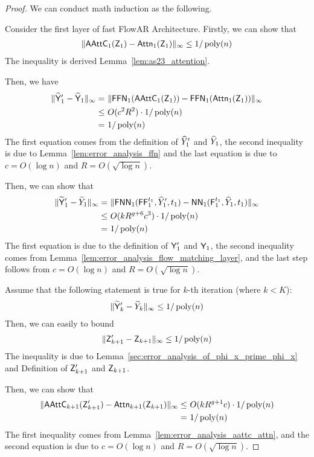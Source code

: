 \begin{proof}
    We can conduct math induction as the following.
    
    Consider the first layer of fast FlowAR Architecture. Firstly, we can show that
    \begin{align*}
        \| \mathsf{AAttC}_1(\mathsf{Z}_{1}) - \mathsf{Attn}_1(\mathsf{Z}_{1})\|_\infty \leq 1/\operatorname{poly}(n)
    \end{align*}
    The inequality is derived Lemma~\ref{lem:as23_attention}.
    
    Then, we have
    \begin{align*}
        \| \widehat{\mathsf{Y}}'_1 - \widehat{\mathsf{Y}}_1\|_\infty =&~ \|\mathsf{FFN}_1(\mathsf{AAttC}_1(\mathsf{Z}_{1})) - \mathsf{FFN}_1(\mathsf{Attn}_1(\mathsf{Z}_{1}))\|_\infty\\
        \leq&~ O(c^2 R^2) \cdot 1/\operatorname{poly}(n)\\
        = &~ 1/\operatorname{poly}(n)
    \end{align*}
    The first equation comes from the definition of $\widehat{Y}'_1$ and $\widehat{Y}_1$, the second inequality is due to Lemma~\ref{lem:error_analysis_ffn} and the last equation is due to $c = O(\log n)$ and $R = O(\sqrt{\log n})$.

    Then, we can show that
    \begin{align*}
        \| \widetilde{\mathsf{Y}}'_1 - \widetilde{Y}_1\|_\infty =&~ \| \mathsf{FNN}_1(\mathsf{FF}^{t_1}_1,\widehat{Y}'_1,t_1)  - \mathsf{NN}_1(\mathsf{F}^{t_1}_1,\widehat{Y}_1,t_1) \|_\infty\\
        \leq &~ O(kR^{g+6}c^3) \cdot 1/\operatorname{poly}(n)\\
        =&~ 1/\operatorname{poly}(n)
    \end{align*}
    The first equation is due to the definition of $\mathsf{Y}'_1$ and $\mathsf{Y}_1$, the second inequality comes from Lemma~\ref{lem:error_analysis_flow_matching_layer}, and the last step follows from $c = O(\log n)$ and $R = O(\sqrt{\log n})$.


    Assume that the following statement is true for $k$-th iteration (where $k < K$):
    \begin{align*}
        \|\widetilde{\mathsf{Y}}'_k - \widetilde{Y}_k\|_\infty \leq 1/\operatorname{poly}(n)
    \end{align*}
    Then, we can easily to bound
    \begin{align*}
        \| \mathsf{Z}'_{k+1} - \mathsf{Z}_{k+1}\|_\infty \leq 1/\operatorname{poly}(n)
    \end{align*}
    The inequality is due to Lemma~\ref{sec:error_analysis_of_phi_x_prime_phi_x} and Definition of $\mathsf{Z}'_{k+1}$ and $\mathsf{Z}_{k+1}$.

    Then, we can show that 
    \begin{align*}
        \|\mathsf{AAttC}_{k+1}(\mathsf{Z}'_{k+1}) -\mathsf{Attn}_{k+1}(\mathsf{Z}_{k+1}) \|_\infty \leq&~ O(k R^{g+1} c) \cdot 1/\operatorname{poly}(n)\\
        =&~ 1/\operatorname{poly}(n) 
    \end{align*}
    The first inequality comes from Lemma~\ref{lem:error_analysis_aattc_attn}, and the second equation is due to $c = O(\log n)$ and $R = O(\sqrt{\log n})$.


\end{proof}
